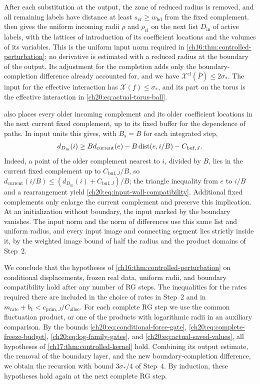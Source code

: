 After each substitution at the output, the zone of reduced radius is removed, and all remaining labels have distance at least $s_{\mathrm{er}}\ge w_{\mathrm{bd}}$ from the fixed complement.  then gives the uniform incoming radii $\rho$ and $\rho_{\mathrm{cl}}$ on the next list $D_{\mathrm{in}}$ of active labels, with the lattices of introduction of its coefficient locations and the volumes of its variables. This is the uniform input norm required in \cref{ch16:thm:controlled-perturbation}; no derivative is estimated with a reduced radius at the boundary of the output. Its adjustment for the completion adds only the boundary-completion difference already accounted for, and we have $\mathcal X^{\mathrm{cl}}(\overline P)\le2\sigma_*$. The input for the effective interaction has $\mathcal X(f)\le\sigma_*$, and its part on the torus is the effective interaction in \eqref{ch20:eq:actual-torus-ball}.

 also places every older incoming complement and its older coefficient locations in the next current fixed complement, up to its fixed buffer for the dependence of paths. In input units this gives, with $B_s=B$ for each integrated step,
\begin{equation}\label{ch20:eq:input-wall-compatibility}
 d_{D_{\mathrm{in}}}(i)\ge Bd_{\mathrm{current}}(e)-B\operatorname{dist}(e,i/B)-C_{\mathrm{buf},J}.
\end{equation}
Indeed, a point of the older complement nearest to $i$, divided by $B$, lies in the current fixed complement up to $C_{\mathrm{buf},J}/B$, so $d_{\mathrm{current}}(i/B)\le(d_{D_{\mathrm{in}}}(i)+C_{\mathrm{buf},J})/B$; the triangle inequality from $e$ to $i/B$ and a rearrangement yield \eqref{ch20:eq:input-wall-compatibility}. Additional fixed complements only enlarge the current complement and preserve this implication. At an initialization without boundary, the input marked by the boundary vanishes. The input norm and the norm of differences use this same list and uniform radius, and every input image and connecting segment lies strictly inside it, by the weighted image bound of half the radius and the product domains of Step~2.

We conclude that the hypotheses of \cref{ch16:thm:controlled-perturbation} on conditional displacements, frozen real data, uniform radii, and boundary compatibility hold after any number of RG steps. The inequalities for the rates required there are included in the choice of rates in Step~2 and in $m_{\mathrm{rate}}+b_1<c_{\mathrm{prim},J}/C_{\mathrm{alloc}}$. For each complete RG step we use the common fluctuation product, or one of the products with logarithmic radii in an auxiliary comparison. By the bounds \eqref{ch20:eq:conditional-force-gate}, \eqref{ch20:eq:complete-freeze-budget}, \eqref{ch20:eq:log-family-gates}, and \eqref{ch20:eq:actual-saved-values}, all hypotheses of \cref{ch17:thm:controlled-kernel} hold. Combining its output estimate, the removal of the boundary layer, and the new boundary-completion difference, we obtain the recursion with bound $3\sigma_*/4$ of Step~4. By induction, these hypotheses hold again at the next complete RG step.

